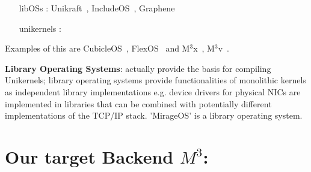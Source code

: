\begin{itemize}
    \item[libOSs]: Unikraft~\cite{kuenzer2021unikraft}, IncludeOS~\cite{bratterud2015includeos}, Graphene~\cite{tsai2014Graphene}
    \item[unikernels]:
\end{itemize}


Examples of this are CubicleOS~\cite{sartakov2021cubicleos}, FlexOS~\cite{lefeuvre2021flexos} and M$^3$x~\cite{Asmussen:M3x}, M$^3$v~\cite{Asmussen:M3v}.


\textbf{Library Operating Systems}: actually provide the basis for compiling Unikernels; library operating systems provide functionalities of monolithic kernels as independent library implementations e.g. device drivers for physical NICs are implemented in libraries that can be combined with potentially different implementations of the TCP/IP stack. 'MirageOS' is a library operating system.

\section{Our target Backend $M^3$:}
